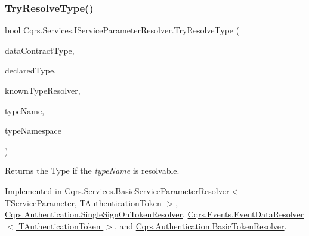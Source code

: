 \mbox{\label{interfaceCqrs_1_1Services_1_1IServiceParameterResolver_a31c82a00b192b877faff6df99e1b689b_a31c82a00b192b877faff6df99e1b689b}} 
\subsubsection{\texorpdfstring{Try\+Resolve\+Type()}{TryResolveType()}}
{\footnotesize\ttfamily bool Cqrs.\+Services.\+I\+Service\+Parameter\+Resolver.\+Try\+Resolve\+Type (\begin{DoxyParamCaption}\item[{Type}]{data\+Contract\+Type,  }\item[{Type}]{declared\+Type,  }\item[{Data\+Contract\+Resolver}]{known\+Type\+Resolver,  }\item[{out Xml\+Dictionary\+String}]{type\+Name,  }\item[{out Xml\+Dictionary\+String}]{type\+Namespace }\end{DoxyParamCaption})}



Returns the Type if the {\itshape type\+Name}  is resolvable. 



Implemented in \hyperlink{classCqrs_1_1Services_1_1BasicServiceParameterResolver_adbc4b10f8931db30768d7ca84bdb0260_adbc4b10f8931db30768d7ca84bdb0260}{Cqrs.\+Services.\+Basic\+Service\+Parameter\+Resolver$<$ T\+Service\+Parameter, T\+Authentication\+Token $>$}, \hyperlink{classCqrs_1_1Authentication_1_1SingleSignOnTokenResolver_af474315b8fc66d17d64460fab8c63dd1_af474315b8fc66d17d64460fab8c63dd1}{Cqrs.\+Authentication.\+Single\+Sign\+On\+Token\+Resolver}, \hyperlink{classCqrs_1_1Events_1_1EventDataResolver_a62be7cd15bb38f3a4054a62e787c473d_a62be7cd15bb38f3a4054a62e787c473d}{Cqrs.\+Events.\+Event\+Data\+Resolver$<$ T\+Authentication\+Token $>$}, and \hyperlink{classCqrs_1_1Authentication_1_1BasicTokenResolver_aee92bd9283bf949149a351c8d8cdb079_aee92bd9283bf949149a351c8d8cdb079}{Cqrs.\+Authentication.\+Basic\+Token\+Resolver}.

